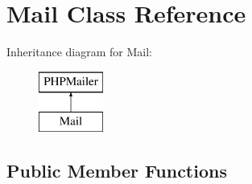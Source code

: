 \hypertarget{classMail}{\section{Mail Class Reference}
\label{classMail}
}
Inheritance diagram for Mail\+:\begin{figure}[H]
\begin{center}
\leavevmode
\includegraphics[height=2.000000cm]{classMail}
\end{center}
\end{figure}
\subsection*{Public Member Functions}
